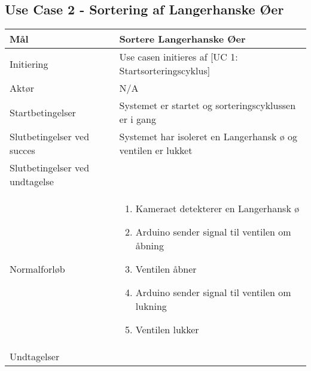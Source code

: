 \subsection{Use Case 2 - Sortering af Langerhanske Øer}
\begin{center}
		\begin{longtable}{ | m{4cm} | m{8cm}| } 
			\hline
			Mål & Sortere Langerhanske Øer \\ 
			\hline
			Initiering &  Use casen initieres af [UC 1: Startsorteringscyklus]\\
			\hline
			Aktør & N/A \\ 
			\hline
			Startbetingelser & Systemet er startet og sorteringscyklussen er i gang\\ 
			\hline	
			Slutbetingelser ved succes & Systemet har isoleret en Langerhansk ø og ventilen er lukket \\
			\hline
			Slutbetingelser ved undtagelse & \\
			\hline
			Normalforløb & \begin{enumerate}
				\setlength\itemsep{0cm} %
				\item Kameraet detekterer en Langerhansk ø
				\item Arduino sender signal til ventilen om åbning
				\item Ventilen åbner
				\item Arduino sender signal til ventilen om lukning
				\item Ventilen lukker
			\end{enumerate} \\ 
			\hline
			Undtagelser & \\
			\hline
		\end{longtable}
		
	\end{center}
	\pagebreak